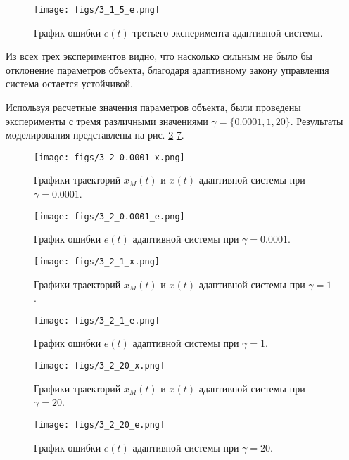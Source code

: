 \documentclass{article}
\begin{document}
\begin{figure}[h!]
  \centering
  \texttt{[image: figs/3\_1\_5\_e.png]}
  \caption{График ошибки $e(t)$ третьего эксперимента адаптивной системы.} 
  \label{fig:3_1_5_e}
\end{figure}
\FloatBarrier

Из всех трех экспериментов видно, что насколько сильным не было бы отклонение параметров объекта, благодаря адаптивному закону управления система остается устойчивой.

Используя расчетные значения параметров объекта, были проведены эксперименты с тремя различными значениями $\gamma = \{0.0001, 1, 20\}$. Результаты моделирования представлены на рис. \ref{fig:3_2_0.0001_x}-\ref{fig:3_2_20_e}.

\begin{figure}[h!]
  \centering
  \texttt{[image: figs/3\_2\_0.0001\_x.png]}
  \caption{Графики траекторий $x_M(t)$ и $x(t)$ адаптивной системы при $\gamma=0.0001$.} 
  \label{fig:3_2_0.0001_x}
\end{figure}

\begin{figure}[h!]
  \centering
  \texttt{[image: figs/3\_2\_0.0001\_e.png]}
  \caption{График ошибки $e(t)$ адаптивной системы при $\gamma=0.0001$.} 
  \label{fig:3_2_0.0001_e}
\end{figure}

\begin{figure}[h!]
  \centering
  \texttt{[image: figs/3\_2\_1\_x.png]}
  \caption{Графики траекторий $x_M(t)$ и $x(t)$ адаптивной системы при $\gamma=1$.} 
  \label{fig:3_2_1_x}
\end{figure}

\begin{figure}[h!]
  \centering
  \texttt{[image: figs/3\_2\_1\_e.png]}
  \caption{График ошибки $e(t)$ адаптивной системы при $\gamma=1$.} 
  \label{fig:3_2_1_e}
\end{figure}

\begin{figure}[h!]
  \centering
  \texttt{[image: figs/3\_2\_20\_x.png]}
  \caption{Графики траекторий $x_M(t)$ и $x(t)$ адаптивной системы при $\gamma=20$.} 
  \label{fig:3_2_20_x}
\end{figure}

\begin{figure}[h!]
  \centering
  \texttt{[image: figs/3\_2\_20\_e.png]}
  \caption{График ошибки $e(t)$ адаптивной системы при $\gamma=20$.} 
  \label{fig:3_2_20_e}
\end{figure}
\FloatBarrier
\end{document}
